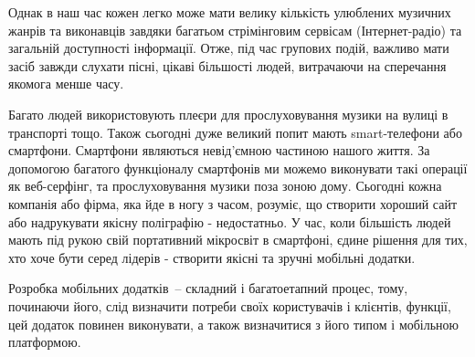 Однак в наш час кожен легко може мати велику кількість улюблених музичних жанрів та виконавців завдяки багатьом стрімінговим сервісам (Інтернет-радіо) та загальній доступності інформації. Отже, під час групових подій, важливо мати засіб завжди слухати пісні, цікаві більшості людей, витрачаючи на сперечання якомога менше часу.

Багато людей використовують плеєри для прослуховування музики на вулиці в транспорті тощо. Також сьогодні дуже великий попит мають smart-телефони або смартфони. Смартфони являються невід’ємною частиною нашого життя. За допомогою багатого функціоналу смартфонів ми можемо виконувати такі операції як веб-серфінг, та прослуховування музики поза зоною дому. Сьогодні кожна компанія або фірма, яка йде в ногу з часом, розуміє, що створити хороший сайт або надрукувати якісну поліграфію - недостатньо. У час, коли більшість людей мають під рукою свій портативний мікросвіт в смартфоні, єдине рішення для тих, хто хоче бути серед лідерів - створити якісні та зручні мобільні додатки.

Розробка мобільних додатків – складний і багатоетапний процес, тому, починаючи його, слід визначити потреби своїх користувачів і клієнтів, функції, цей додаток повинен виконувати, а також визначитися з його типом і мобільною платформою.
